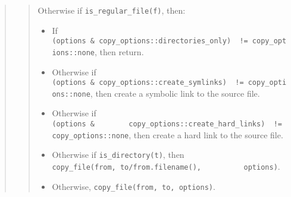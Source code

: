 \begin{quote}
\begin{quote}
Otherwise if \texttt{is\_regular\_file(f)}, then:

\begin{itemize}
\tightlist
\item
  If
  \texttt{(options\ \&\ copy\_options::directories\_only)\ ~!=\ copy\_options::none},
  then return.
\item
  Otherwise if
  \texttt{(options\ \&\ copy\_options::create\_symlinks)\ ~!=\ copy\_options::none},
  then create a symbolic link to the source file.
\item
  Otherwise if
  \texttt{(options\ \&\ \ \ \ \ \ \ \ copy\_options::create\_hard\_links)\ ~!=\ copy\_options::none},
  then create a hard link to the source file.
\item
  Otherwise if \texttt{is\_directory(t)}, then
  \texttt{copy\_file(from,\ to/from.filename(),\ \ \ \ \ \ \ \ \ \ options)}.
\item
  Otherwise, \texttt{copy\_file(from,\ to,\ options)}.
\end{itemize}
\end{quote}
\end{quote}

